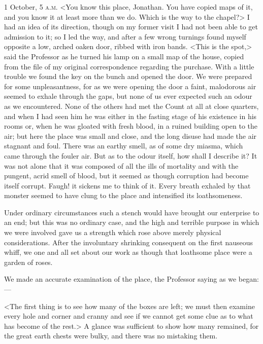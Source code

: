 \begin{diary}{1 October, 5 \textsc{a.m.}}
<You know this place, Jonathan. You have copied maps of it, and you know it at least more than we do. Which is the way to the chapel?> I had an idea of its direction, though on my former visit I had not been able to get admission to it; so I led the way, and after a few wrong turnings found myself opposite a low, arched oaken door, ribbed with iron bands. <This is the spot,> said the Professor as he turned his lamp on a small map of the house, copied from the file of my original correspondence regarding the purchase. With a little trouble we found the key on the bunch and opened the door. We were prepared for some unpleasantness, for as we were opening the door a faint, malodorous air seemed to exhale through the gaps, but none of us ever expected such an odour as we encountered. None of the others had met the Count at all at close quarters, and when I had seen him he was either in the fasting stage of his existence in his rooms or, when he was gloated with fresh blood, in a ruined building open to the air; but here the place was small and close, and the long disuse had made the air stagnant and foul. There was an earthy smell, as of some dry miasma, which came through the fouler air. But as to the odour itself, how shall I describe it? It was not alone that it was composed of all the ills of mortality and with the pungent, acrid smell of blood, but it seemed as though corruption had become itself corrupt. Faugh! it sickens me to think of it. Every breath exhaled by that monster seemed to have clung to the place and intensified its loathsomeness.

Under ordinary circumstances such a stench would have brought our enterprise to an end; but this was no ordinary case, and the high and terrible purpose in which we were involved gave us a strength which rose above merely physical considerations. After the involuntary shrinking consequent on the first nauseous whiff, we one and all set about our work as though that loathsome place were a garden of roses.

We made an accurate examination of the place, the Professor saying as we began:—

<The first thing is to see how many of the boxes are left; we must then examine every hole and corner and cranny and see if we cannot get some clue as to what has become of the rest.> A glance was sufficient to show how many remained, for the great earth chests were bulky, and there was no mistaking them.


\end{diary}
